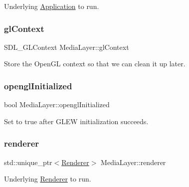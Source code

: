 Underlying \hyperlink{class_application}{Application} to run.

\hypertarget{class_media_layer_a0e027d967e7c796efaed751e0b0a7090}{}\label{class_media_layer_a0e027d967e7c796efaed751e0b0a7090}
\subsubsection{\texorpdfstring{gl\+Context}{glContext}}
{\footnotesize\ttfamily S\+D\+L\+\_\+\+G\+L\+Context Media\+Layer\+::gl\+Context\hspace{0.3cm}{\ttfamily [private]}}



Store the Open\+GL context so that we can clean it up later.

\hypertarget{class_media_layer_abb67004f8dd82afd036233dfb225df3d}{}\label{class_media_layer_abb67004f8dd82afd036233dfb225df3d}
\subsubsection{\texorpdfstring{opengl\+Initialized}{openglInitialized}}
{\footnotesize\ttfamily bool Media\+Layer\+::opengl\+Initialized\hspace{0.3cm}{\ttfamily [private]}}



Set to true after G\+L\+EW initialization succeeds.

\hypertarget{class_media_layer_aee28804a7f4e1fb771b11e93b218e387}{}\label{class_media_layer_aee28804a7f4e1fb771b11e93b218e387}
\subsubsection{\texorpdfstring{renderer}{renderer}}
{\footnotesize\ttfamily std\+::unique\+\_\+ptr$<$\hyperlink{class_renderer}{Renderer}$>$ Media\+Layer\+::renderer\hspace{0.3cm}{\ttfamily [private]}}



Underlying \hyperlink{class_renderer}{Renderer} to run.

\hypertarget{class_media_layer_ab577253a72d7d158badb3932f09e7d3f}{}\label{class_media_layer_ab577253a72d7d158badb3932f09e7d3f}
